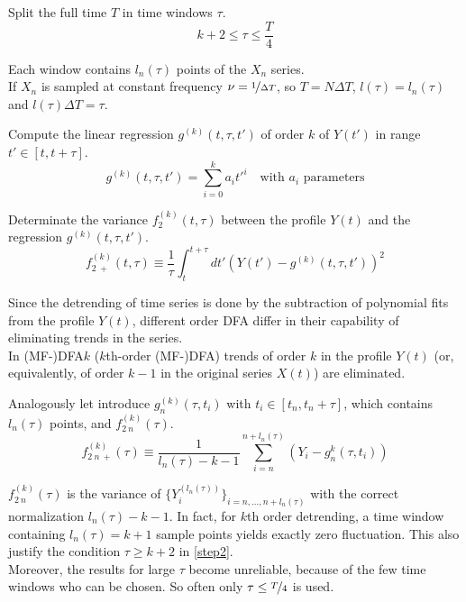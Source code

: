 \begin{step}\label{step2}
Split the full time $T$ in time windows $\tau$.
\begin{equation}
	k+2 \le \tau \le \frac{T}{4}
\end{equation}

Each window contains $l_n(\tau)$ points of the $X_n$ series. \\
If $X_n$ is sampled at constant frequency $\nu = \nicefrac{1}{\Delta T}$, so $T = N \Delta T$, $l(\tau) = l_n(\tau)$ and $l(\tau) \Delta T = \tau $. 
\end{step}

\begin{step}\label{step3}
Compute the linear regression $ g^{( k )}(t, \tau, t') $ of order $k$ of $Y(t')$ in range $t' \in \left[t, t + \tau \right]$.
\begin{equation}
	g^{( k )}(t, \tau, t') = \sum_{i=0}^{k} a_i t'^{i} \quad \text{with $a_i$ parameters}
\end{equation}

Determinate the variance $ f_2^{( k )}( t, \tau ) $ between the profile $ Y(t) $ and the regression $ g^{( k )}(t, \tau, t') $.
\begin{equation}
	f_{2 \ +}^{( k )}( t, \tau ) \equiv \frac{1}{\tau} \int_{t}^{t+\tau} dt' \left( Y( t' ) - g^{( k )}(t, \tau, t')  \right)^2
\end{equation}

Since the detrending of time series is done by the subtraction of polynomial fits from the profile $Y(t)$, different order DFA differ in their capability of eliminating trends in the series.\\
In (MF-)DFA$k$ ($k$th-order (MF-)DFA) trends of order $k$ in the profile $Y(t)$ (or, equivalently, of order $k-1$ in the original series $X(t)$) are eliminated. 

Analogously let introduce $g_n^{(k)}(\tau, t_i)$ with $t_i \in [t_n, t_n + \tau]$, which contains $l_n(\tau)$ points, and $f_{2\ n}^{( k )}( \tau )$.
\begin{equation}
	f_{2\ n \ +}^{( k )}( \tau ) \equiv \frac{1}{l_n(\tau) - k - 1} \sum_{i=n}^{n + l_n(\tau)} \left(Y_i - g_n^{k} (\tau, t_i) \right)
\end{equation}

$f_{2\ n}^{( k )}( \tau )$ is the variance of $\{ Y^{(l_n(\tau))}_i\}_{i= n, \dots, n+l_n(\tau)} $ with the correct normalization $l_n(\tau) - k - 1$. In fact, for $k$th order detrending, a time window containing $l_n(\tau) = k + 1$ sample points yields exactly zero fluctuation. This also justify the condition $\tau \ge k+2$ in \autoref{step2}.\\
Moreover, the results for large $\tau$ become unreliable, because of the few time windows who can be chosen. So often only $\tau \le \nicefrac{T}{4}$ is used. 


\end{step}
